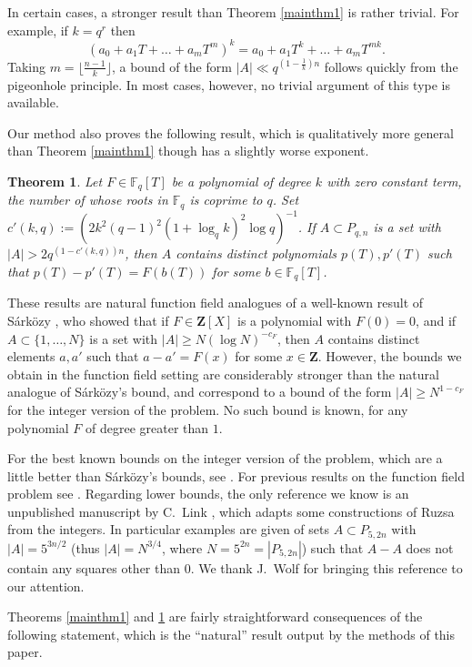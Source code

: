 \documentclass[12pt,reqno]{amsart}
\newtheorem{theorem}{Theorem}[section]
\theoremstyle{definition}
\renewcommand{\geq}{\geqslant}
\def\F{\mathbb{F}}
\def\Z{\mathbf{Z}}
\numberwithin{equation}{section}
\begin{document}
In certain cases, a stronger result than Theorem \ref{mainthm1} is rather trivial. For example, if $k = q^r$ then
\[ (a_0 + a_1 T + \dots + a_m T^m)^{k} = a_0 + a_1 T^k + \dots + a_m T^{mk}.\] Taking $m = \lfloor \frac{n-1}{k} \rfloor$, a bound of the form $|A| \ll q^{(1 - \frac{1}{k}) n}$ follows quickly from the pigeonhole principle. In most cases, however, no trivial argument of this type is available.

Our method also proves the following result, which is qualitatively more general than Theorem \ref{mainthm1} though has a slightly worse exponent.

\begin{theorem}\label{mainthm2}
Let $F \in \F_q[T]$ be a polynomial of degree $k$ with zero constant term, the number of whose roots in $\F_q$ is coprime to $q$. Set $c'(k,q) := (2 k^2 (q - 1)^2 (1 + \log_q k)^2 \log q)^{-1}$. If $A \subset P_{q,n}$ is a set with $|A| > 2 q^{(1 - c'(k,q))n}$, then $A$ contains distinct polynomials $p(T), p'(T)$ such that $p(T) - p'(T) = F(b(T))$ for some $b \in \F_q[T]$. 
\end{theorem}

These results are natural function field analogues of a well-known result of S\'ark\"ozy \cite{sarkozy}, who showed that if $F \in \Z[X]$ is a polynomial with $F(0) = 0$, and if $A \subset \{1,\dots, N\}$ is a set with $|A| \geq N(\log N)^{-c_F}$, then $A$ contains distinct elements $a, a'$ such that $a - a' = F(x)$ for some $x \in \Z$. However, the bounds we obtain in the function field setting are considerably stronger than the natural analogue of S\'ark\"ozy's bound, and correspond to a bound of the form $|A| \geq N^{1 - c_F}$ for the integer version of the problem. No such bound is known, for any polynomial $F$ of degree greater than $1$. 

For the best known bounds on the integer version of the problem, which are a little better than S\'ark\"ozy's bounds, see \cite{ppss}. For previous results on the function field problem see \cite{hoang}. Regarding lower bounds, the only reference we know is an unpublished manuscript by C.~Link \cite{link}, which adapts some constructions of Ruzsa \cite{ruzsa} from the integers. In particular examples are given of sets $A \subset P_{5,2n}$ with $|A| = 5^{3n/2}$ (thus $|A| = N^{3/4}$, where $N = 5^{2n} = |P_{5,2n}|$) such that $A - A$ does not contain any squares other than 0. We thank J.~Wolf for bringing this reference to our attention. 

Theorems \ref{mainthm1} and \ref{mainthm2} are fairly straightforward consequences of the following statement, which is the ``natural'' result output by the methods of this paper.
\end{document}
